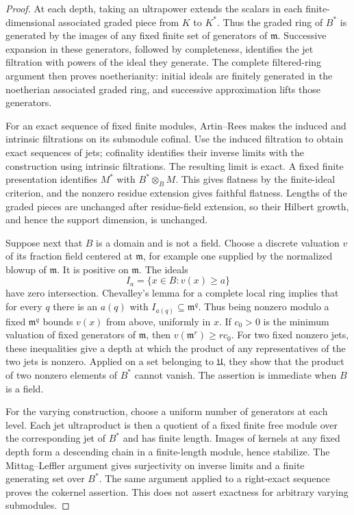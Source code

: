 \begin{proof}
At each depth, taking an ultrapower extends the scalars in each
finite-dimensional associated graded piece from $K$ to $K^*$.
Thus the graded ring of $B^*$ is generated by the images of any
fixed finite set of generators of $\mathfrak m$.  Successive
expansion in these generators, followed by completeness, identifies
the jet filtration with powers of the ideal they generate.
The complete filtered-ring argument then proves noetherianity:
initial ideals are finitely generated in the noetherian associated
graded ring, and successive approximation lifts those generators.

For an exact sequence of fixed finite modules, Artin--Rees makes
the induced and intrinsic filtrations on its submodule cofinal.
Use the induced filtration to obtain exact sequences of jets;
cofinality identifies their inverse limits with the construction
using intrinsic filtrations.  The resulting limit is exact.  A fixed
finite presentation identifies $M^*$ with $B^*\otimes_B M$.
This gives flatness by the finite-ideal criterion, and the nonzero
residue extension gives faithful flatness.  Lengths of the graded
pieces are unchanged after residue-field extension, so their
Hilbert growth, and hence the support dimension, is unchanged.

Suppose next that $B$ is a domain and is not a field.  Choose a
discrete valuation $v$ of its fraction field centered at
$\mathfrak m$, for example one supplied by the normalized blowup
of $\mathfrak m$.  It is positive on $\mathfrak m$.  The ideals
\[
 I_a=\{x\in B:v(x)\geq a\}
\]
have zero intersection.  Chevalley's lemma for a complete local
ring implies that for every $q$ there is an $a(q)$ with
$I_{a(q)}\subseteq\mathfrak m^q$.  Thus being nonzero modulo a
fixed $\mathfrak m^q$ bounds $v(x)$ from above, uniformly in $x$.
If $c_0>0$ is the minimum valuation of fixed generators of
$\mathfrak m$, then $v(\mathfrak m^r)\geq rc_0$.
For two fixed nonzero jets, these inequalities give a depth at
which the product of any representatives of the two jets is
nonzero.  Applied on a set belonging to $\mathfrak U$, they show
that the product of two nonzero elements of $B^*$ cannot vanish.
The assertion is immediate when $B$ is a field.

For the varying construction, choose a uniform number of generators
at each level.  Each jet ultraproduct is then a quotient of a fixed
finite free module over the corresponding jet of $B^*$ and has
finite length.  Images of kernels at any fixed depth form a
descending chain in a finite-length module, hence stabilize.
The Mittag--Leffler argument gives surjectivity on inverse limits
and a finite generating set over $B^*$.  The same argument applied
to a right-exact sequence proves the cokernel assertion.  This
does not assert exactness for arbitrary varying submodules.


\end{proof}
